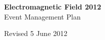 

\newcommand{\st}{\superscript{st} }
\newcommand{\nd}{\superscript{nd} }



\begin{titlepage}
\begin{center}
{\bf \LARGE Electromagnetic Field 2012}\\[36pt]
{\Large Event Management Plan}

\vfill
Revised 5 June 2012

\end{center}
\end{titlepage}



